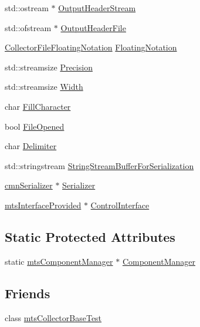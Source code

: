 \begin{DoxyCompactItemize}
\item 
std\-::ostream $\ast$ \hyperlink{classmts_collector_base_aa58c68b0e196175b2f0b35f8a2877c54}{Output\-Header\-Stream}
\item 
std\-::ofstream $\ast$ \hyperlink{classmts_collector_base_ac11bfb1b9eceb30e20bb216454e8d067}{Output\-Header\-File}
\item 
\hyperlink{classmts_collector_base_ad5d486fde9f8105e4de551d00026ea93}{Collector\-File\-Floating\-Notation} \hyperlink{classmts_collector_base_a1f80a8a534930afcbeade8a12f7d63e3}{Floating\-Notation}
\item 
std\-::streamsize \hyperlink{classmts_collector_base_a86d6b8c24e20957932325ce8183d0abf}{Precision}
\item 
std\-::streamsize \hyperlink{classmts_collector_base_add0435d1bd0dfaed9f54bc82831ca3ea}{Width}
\item 
char \hyperlink{classmts_collector_base_a7d28e7a5dc2c367f963a53f9b786776d}{Fill\-Character}
\item 
bool \hyperlink{classmts_collector_base_a051e5495fad8d0ade499d031e8d9ffbc}{File\-Opened}
\item 
char \hyperlink{classmts_collector_base_a7d711ebe23e8573509789daa9e7392e6}{Delimiter}
\item 
std\-::stringstream \hyperlink{classmts_collector_base_a782f339bd561cc62d195544fdb873834}{String\-Stream\-Buffer\-For\-Serialization}
\item 
\hyperlink{classcmn_serializer}{cmn\-Serializer} $\ast$ \hyperlink{classmts_collector_base_abf646aaaee11b73bf1fff9f31131fac1}{Serializer}
\item 
\hyperlink{classmts_interface_provided}{mts\-Interface\-Provided} $\ast$ \hyperlink{classmts_collector_base_abfd24852cb33dc25956b49ed2896ac10}{Control\-Interface}
\end{DoxyCompactItemize}
\subsection*{Static Protected Attributes}
\begin{DoxyCompactItemize}
\item 
static \hyperlink{mts_task_manager_8h_aa743a07890f6b7715c62cc9384bf994b}{mts\-Component\-Manager} $\ast$ \hyperlink{classmts_collector_base_a5d4cca6b7e903dec79a349efc63ba8a0}{Component\-Manager}
\end{DoxyCompactItemize}
\subsection*{Friends}
\begin{DoxyCompactItemize}
\item 
class \hyperlink{classmts_collector_base_a6743a1c340e3a1cc2078915e17f6678e}{mts\-Collector\-Base\-Test}
\end{DoxyCompactItemize}
